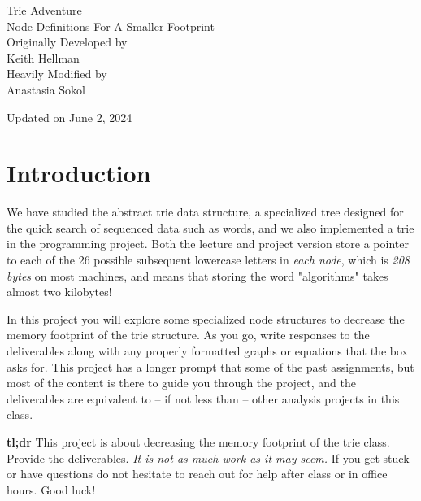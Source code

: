 \documentclass{article}
\begin{document}
\begin{titlepage}
    \centering
    \vspace{2cm}
    
    {\Huge Trie Adventure}\\[2cm]
    
    {\huge Node Definitions For A Smaller Footprint}\\[2cm]
    
    {\large Originally Developed by}\\[0.3cm]
    {\large Keith Hellman}\\[2cm]
    
    {\large Heavily Modified by}\\[0.3cm]
    {\large Anastasia Sokol}\\
    
    \vfill
    
    {\large Updated on June 2, 2024}
\end{titlepage}

\section{Introduction}

We have studied the abstract trie data structure, a specialized tree designed for the quick search of sequenced data such as words, and we also implemented a trie in the programming project. Both the lecture and project version store a pointer to each of the 26 possible subsequent lowercase letters in \textit{each node}, which is \textit{208 bytes} on most machines, and means that storing the word "algorithms" takes almost two kilobytes!

In this project you will explore some specialized node structures to decrease the memory footprint of the trie structure. As you go, write responses to the deliverables along with any properly formatted graphs or equations that the box asks for. This project has a longer prompt that some of the past assignments, but most of the content is there to guide you through the project, and the deliverables are equivalent to -- if not less than -- other analysis projects in this class.

\begin{tcolorbox}[colback=tldrbox, colframe=black, width=\textwidth, boxrule=0.5mm, arc=5mm, auto outer arc]
        \textbf{tl;dr} This project is about decreasing the memory footprint of the trie class. Provide the deliverables. \textit{It is not as much work as it may seem.} If you get stuck or have questions do not hesitate to reach out for help after class or in office hours. Good luck!
\end{tcolorbox}
\end{document}
